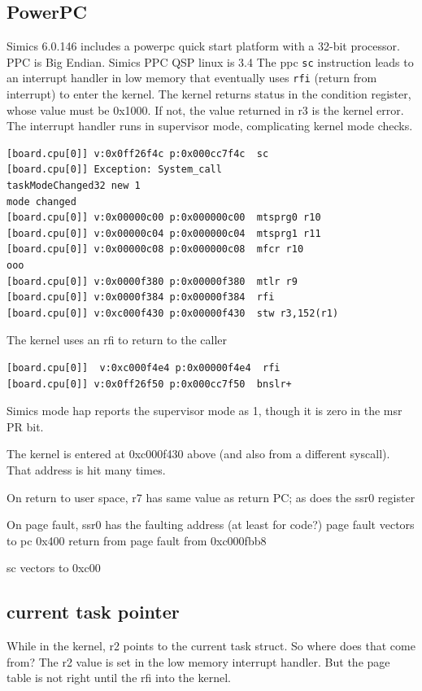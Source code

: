 \documentclass[titlepage]{article}
\begin{document}
\begin{appendices}
\section{PowerPC}
Simics 6.0.146 includes a powerpc quick start platform with a 32-bit processor.
PPC is Big Endian.   Simics PPC QSP linux is 3.4
The ppc {\tt sc} instruction leads to an interrupt handler in low memory that
eventually uses {\tt rfi} (return from interrupt) to enter the kernel.
The kernel returns status in the condition register, whose value must be 0x1000.
If not, the value returned in r3 is the kernel error.
The interrupt handler runs in supervisor mode, complicating kernel mode checks.

\begin{verbatim}
[board.cpu[0]] v:0x0ff26f4c p:0x000cc7f4c  sc
[board.cpu[0]] Exception: System_call
taskModeChanged32 new 1
mode changed
[board.cpu[0]] v:0x00000c00 p:0x000000c00  mtsprg0 r10
[board.cpu[0]] v:0x00000c04 p:0x000000c04  mtsprg1 r11
[board.cpu[0]] v:0x00000c08 p:0x000000c08  mfcr r10
ooo
[board.cpu[0]] v:0x0000f380 p:0x00000f380  mtlr r9
[board.cpu[0]] v:0x0000f384 p:0x00000f384  rfi
[board.cpu[0]] v:0xc000f430 p:0x00000f430  stw r3,152(r1)
\end{verbatim}

The kernel uses an rfi to return to the caller

\begin{verbatim}
[board.cpu[0]]  v:0xc000f4e4 p:0x00000f4e4  rfi
[board.cpu[0]] v:0x0ff26f50 p:0x000cc7f50  bnslr+
\end{verbatim}

Simics mode hap reports the supervisor mode as 1, though it is zero in the msr PR bit.

The kernel is entered at 0xc000f430 above (and also from a different syscall). That
address is hit many times.

On return to user space, r7 has same value as return PC; as does the ssr0 register

On page fault, ssr0 has the faulting address (at least for code?)
page fault vectors to pc 0x400
return from page fault from 0xc000fbb8

sc vectors to 0xc00

\subsection{current task pointer}
While in the kernel, r2 points to the current task struct.  So where does that come from?
The r2 value is set in the low memory interrupt handler.  But the page table is not right
until the rfi into the kernel.


\end{appendices}
\end{document}
